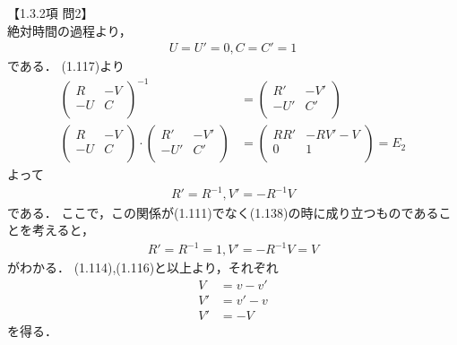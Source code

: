\documentclass[dvipdfmx,uplatex,a4paper,11pt]{jsarticle}
\begin{document}
【1.3.2項 問2】 \\
 
絶対時間の過程より，
\begin{align*}
  U=U'=0,C=C'=1
\end{align*}
である．
(1.117)より
\begin{align*}
  \left(
  \begin{matrix}
    R & -V \\
    -U & C \\
  \end{matrix}
  \right)^{-1}
  &=
  \left(
  \begin{matrix}
    R' & -V' \\
    -U' & C' \\
  \end{matrix} 
  \right) \\
  \left(
  \begin{matrix}
    R & -V \\
    -U & C \\
  \end{matrix}
  \right)
  \cdot 
  \left(
  \begin{matrix}
    R' & -V' \\
    -U' & C' \\
  \end{matrix}
  \right)
  &=
  \left(
  \begin{matrix}
    RR' & -RV'-V \\
    0 & 1 \\
  \end{matrix}
  \right)
  =
  E_2
\end{align*}
よって
\begin{align*}
  R' = R^{-1}, V' = -R^{-1}V
\end{align*}
である．
ここで，この関係が(1.111)でなく(1.138)の時に成り立つものであることを考えると，
\begin{align*}
  R' = R^{-1} = 1, V' = -R^{-1}V = V
\end{align*}
がわかる．
(1.114),(1.116)と以上より，それぞれ
\begin{align*}
  V &= v - v' \\
  V' &= v' - v \\
  V' &= -V
\end{align*}
を得る．
\end{document}
